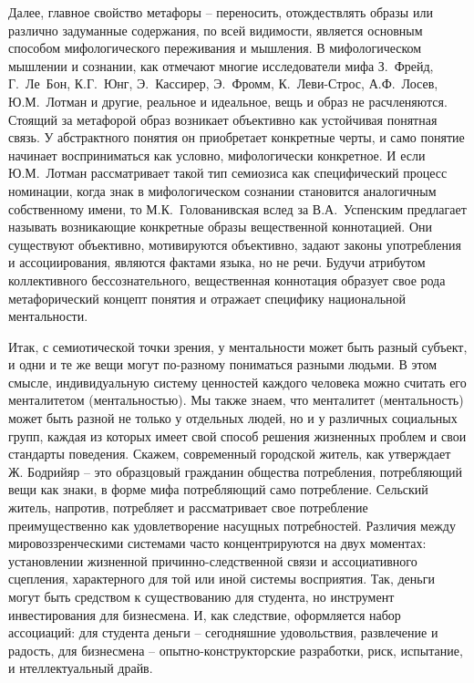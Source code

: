 Далее, главное свойство метафоры -- переносить, отождествлять образы или различно
задуманные содержания, по всей видимости, является основным способом мифологического
переживания и мышления. В мифологическом мышлении и сознании, как отмечают многие
исследователи мифа З.~Фрейд, Г.~Ле~Бон, К.Г.~Юнг, Э.~Кассирер, Э.~Фромм, К.~Леви-Строс,
А.Ф.~Лосев, Ю.М.~Лотман и другие, реальное и идеальное, вещь и образ не расчленяются.
Стоящий за метафорой образ возникает объективно как устойчивая понятная связь. У абстрактного
понятия он приобретает конкретные черты, и само понятие начинает восприниматься как условно,
мифологически конкретное. И если Ю.М.~Лотман рассматривает такой тип семиозиса как специфический
процесс номинации, когда знак в мифологическом сознании становится аналогичным собственному имени\autocite{name_culture},
то М.К.~Голованивская вслед за В.А.~Успенским предлагает называть возникающие конкретные образы
вещественной коннотацией\autocite{uspensky}. Они существуют объективно, мотивируются объективно,
задают законы употребления и ассоциирования, являются фактами языка, но не речи. Будучи атрибутом
коллективного бессознательного, вещественная коннотация образует свое рода метафорический концепт
понятия и отражает специфику национальной ментальности.

Итак, с семиотической точки зрения, у ментальности может быть разный субъект,
и одни и те же вещи могут по-разному пониматься разными людьми. В этом смысле, индивидуальную
систему ценностей каждого человека можно считать его менталитетом (ментальностью). Мы также знаем,
что менталитет (ментальность) может быть разной не только у отдельных людей, но и у различных
социальных групп, каждая из которых имеет свой способ решения жизненных проблем и свои стандарты поведения.
Скажем, современный городской житель, как утверждает Ж. Бодрийяр -- это образцовый гражданин общества
потребления, потребляющий вещи как знаки, в форме мифа потребляющий само потребление\autocite{bodriyar_society}.
Сельский житель, напротив, потребляет и рассматривает свое потребление преимущественно как удовлетворение
насущных потребностей. Различия между мировоззренческими системами часто концентрируются на двух моментах:
установлении жизненной причинно-следственной связи и ассоциативного сцепления, характерного для той или
иной системы восприятия. Так, деньги могут быть средством к существованию для студента, но инструмент инвестирования
для бизнесмена. И, как следствие, оформляется набор ассоциаций: для студента деньги -- сегодняшние удовольствия,
развлечение и радость, для бизнесмена -- опытно-конструкторские разработки, риск, испытание, и
нтеллектуальный драйв.

